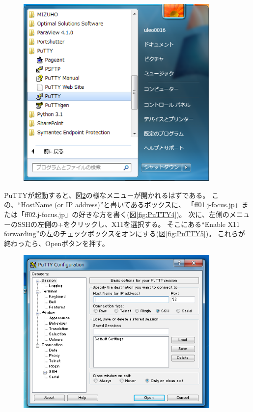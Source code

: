 \documentclass[12pt,a4paper,dvipdfmx]{jarticle}
\begin{document}
\begin{figure}
  \begin{center}
    \includegraphics[clip, width=10.0cm]{fig/PuTTY2_.png}
  \end{center}
  \caption{}
  \label{fig:PuTTY2}
\end{figure}
PuTTYが起動すると、図\ref{fig:PuTTY3}の様なメニューが開かれるはずである。
この、``HostName (or IP address)''と書いてあるボックスに、
「ff01.j-focus.jp」または「ff02.j-focus.jp」の好きな方を書く(図\ref{fig:PuTTY4})。
次に、左側のメニューのSSHの左側の+をクリックし、X11を選択する。
そこにある``Enable X11 forwarding''の左のチェックボックスをオンにする(図\ref{fig:PuTTY5})。
これらが終わったら、Openボタンを押す。
\begin{figure}
  \begin{center}
    \includegraphics[clip, width=10.0cm]{fig/PuTTY3_.png}
  \end{center}
  \caption{}
  \label{fig:PuTTY3}
\end{figure}
\end{document}
